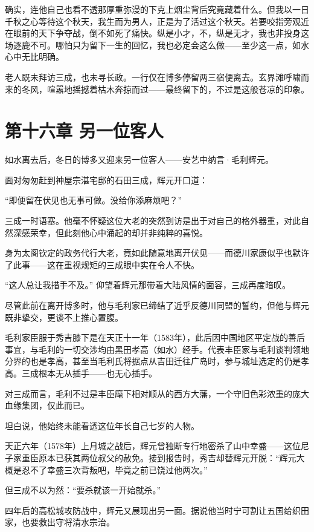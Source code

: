 \documentclass[
]{book}
\begin{document}
确实，连他自己也看不透那厚重弥漫的下克上烟尘背后究竟藏着什么。但我以一日千秋之心等待这个秋天，我生而为男人，正是为了活过这个秋天。若要咬指旁观近在眼前的天下争夺战，倒不如死了痛快。纵是小才，不，纵是无才，我也非投身这场逐鹿不可。哪怕只为留下一生的回忆，我也必定会这么做------至少这一点，如水心中无比明确。

老人既未拜访三成，也未寻长政。一行仅在博多停留两三宿便离去。玄界滩呼啸而来的冬风，喧嚣地摇撼着枯木奔掠而过------最终留下的，不过是这般苍凉的印象。

\chapter*{第十六章 另一位客人}\label{ux7b2cux5341ux516dux7ae0-ux53e6ux4e00ux4f4dux5ba2ux4eba}

如水离去后，冬日的博多又迎来另一位客人------安艺中纳言·毛利辉元。

面对匆匆赶到神屋宗湛宅邸的石田三成，辉元开口道：

``即便留在伏见也无事可做。没给你添麻烦吧？''

三成一时语塞。他毫不怀疑这位大老的突然到访是出于对自己的格外器重，对此自然深感荣幸，但此刻他心中涌起的却并非纯粹的喜悦。

身为太阁钦定的政务代行大老，竟如此随意地离开伏见------而德川家康似乎也默许了此事------这在重视规矩的三成眼中实在令人不快。

``这人总让我措手不及。'' 仰望着辉元那带着大陆风情的面容，三成再度暗叹。

尽管此前在离开博多时，他与毛利家已缔结了近乎反德川同盟的誓约，但他与辉元既非挚交，更谈不上推心置腹。

毛利家臣服于秀吉膝下是在天正十一年（1583年），此后因中国地区平定战的善后事宜，与毛利的一切交涉均由黑田孝高（如水）经手。代表丰臣家与毛利谈判领地分界的也是孝高，甚至当毛利氏将据点从吉田迁往广岛时，参与城址选定的仍是孝高。三成根本无从插手------也无心插手。

对三成而言，毛利不过是丰臣麾下相对顺从的西方大藩，一个守旧色彩浓重的庞大血缘集团，仅此而已。

坦白说，他始终未能看透这位年长自己七岁的人物。

天正六年（1578年）上月城之战后，辉元曾独断专行地密杀了山中幸盛------这位尼子家重臣原本已获其两位叔父的赦免。接到报告时，秀吉却替辉元开脱：``辉元大概是忍不了幸盛三次背叛吧，毕竟之前已饶过他两次。''

但三成不以为然：``要杀就该一开始就杀。''

四年后的高松城攻防战中，辉元又展现出另一面。据说他当时宁可割让五国给织田家，也要救出守将清水宗治。
\end{document}

